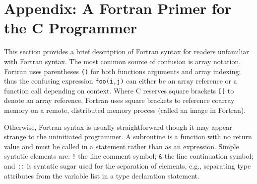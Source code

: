 \section*{Appendix: A Fortran Primer for the C Programmer}

This section provides a brief description of Fortran syntax for readers unfamiliar with Fortran
syntax.  The most common source of confusion is array notation.  Fortran uses parentheses
\texttt{()} for both functions arguments and array indexing; thus the confusing expression
\texttt{foo(i,j)} can either be an array reference or a function call depending on context.  Where C
reserves square brackets \texttt{[]} to denote an array reference, Fortran uses square brackets to
reference coarray memory on a remote, distributed memory process (called an image in Fortran).

Otherwise, Fortran syntax is usually straightforward though it may appear strange to the uninitiated
programmer.  A subroutine is a function with no return value and must be called in a statement
rather than as an expression.  Simple syntatic elements are: \texttt{!} the line comment symbol;
\texttt{\&} the line continuation symbol; and \texttt{::} is syntatic sugar used for the separation
of elements, e.g., separating type attributes from the variable list in a type declaration
statement.
